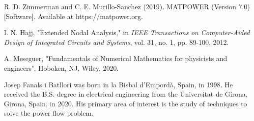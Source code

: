 \documentclass[journal]{IEEEtran}
\begin{document}
\begin{thebibliography}{31}
R. D. Zimmerman and C. E. Murillo-Sanchez (2019). MATPOWER (Version 7.0) [Software]. Available at https://matpower.org.

I. N. Hajj, "Extended Nodal Analysis," in \emph{IEEE Transactions on Computer-Aided Design of Integrated Circuits and Systems}, vol. 31, no. 1, pp. 89-100, 2012.

\newpage
\IEEEtriggercmd{\enlargethispage{1in}}

A. Meseguer, "Fundamentals of Numerical Mathematics for physicists and engineers", Hoboken, NJ, Wiley, 2020.



\end{thebibliography}

\begin{IEEEbiography}{Josep Fanals i Batllori}
was born in la Bisbal d'Empordà, Spain, in 1998. He received the B.S. degree in electrical engineering from the Universitat de Girona, Girona, Spain, in 2020. His primary area of interest is the study of techniques to solve the power flow problem.
\end{IEEEbiography}



\vfill








\end{document}

